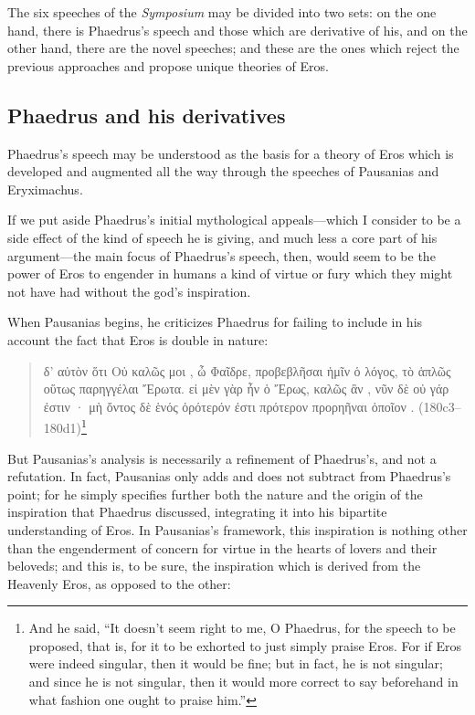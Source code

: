The six speeches of the \emph{Symposium} may be divided into two sets:
on the one hand, there is Phaedrus's speech and those which are
derivative of his, and on the other hand, there are the novel speeches;
and these are the ones which reject the previous approaches and propose
unique theories of Eros.

\subsection*{Phaedrus and his derivatives}

Phaedrus's speech may be understood as the basis for a theory of Eros
which is developed and augmented all the way through the speeches of
Pausanias and Eryximachus.

If we put aside Phaedrus's initial mythological appeals---which I
consider to be a side effect of the kind of speech he is giving, and
much less a core part of his argument---the main focus of Phaedrus's
speech, then, would seem to be the power of Eros to engender in humans a
kind of virtue or fury which they might not have had without the god's
inspiration.

When Pausanias begins, he criticizes Phaedrus for failing to include in
his account the fact that Eros is double in nature:

\begin{quote}
\textgreek{ δ' αὐτὸν ὅτι Οὐ καλῶς μοι , ὦ
Φαῖδρε, προβεβλῆσαι ἡμῖν ὁ λόγος, τὸ ἁπλῶς οὕτως
παρηγγέλαι  Ἔρωτα. εἰ μὲν γὰρ  ἦν
ὁ Ἔρως, καλῶς ἂν , νῦν δὲ οὐ γάρ ἐστιν · μὴ ὄντος
δὲ ἑνός ὀρότερόν ἐστι πρότερον προρηῆναι ὁποῖον
 .} (180c3--180d1)\footnote{And he said, ``It
doesn't seem right to me, O Phaedrus, for the speech to be proposed,
that is, for it to be exhorted to just simply praise Eros. For if Eros
were indeed singular, then it would be fine; but in fact, he is not
singular; and since he is not singular, then it would more correct to
say beforehand in what fashion one ought to praise him.''}
\end{quote}

But Pausanias's analysis is necessarily a refinement of Phaedrus's, and
not a refutation. In fact, Pausanias only adds and does not subtract
from Phaedrus's point; for he simply specifies further both the nature
and the origin of the inspiration that Phaedrus discussed, integrating
it into his bipartite understanding of Eros. In Pausanias's framework,
this inspiration is nothing other than the engenderment of concern for
virtue in the hearts of lovers and their beloveds; and this is, to be
sure, the inspiration which is derived from the Heavenly Eros, as
opposed to the other:

